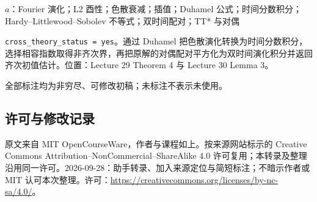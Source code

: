 \documentclass[UTF8,11pt]{ctexart}
\theoremstyle{definition}
\begin{document}
$a$：Fourier 演化；L2 酉性；色散衰减；插值；Duhamel 公式；时间分数积分；Hardy--Littlewood--Sobolev 不等式；双时间配对；TT* 与对偶

\texttt{cross\_theory\_status = yes}。通过 Duhamel 把色散演化转换为时间分数积分，选择相容指数取得非齐次界，再把原解的对偶配对平方化为双时间演化积分并返回齐次初值估计。位置：Lecture 29 Theorem 4 与 Lecture 30 Lemma 3。

全部标注均为非穷尽、可修改初稿；未标注不表示未使用。
\subsection*{许可与修改记录}
原文来自 MIT OpenCourseWare，作者与课程如上。按来源网站标示的 Creative Commons Attribution--NonCommercial--ShareAlike 4.0 许可复用；本转录及整理沿用同一许可。2026-09-28：助手转录、加入来源定位与简短标注；不暗示作者或 MIT 认可本次整理。许可：\url{https://creativecommons.org/licenses/by-nc-sa/4.0/}。
\end{document}
